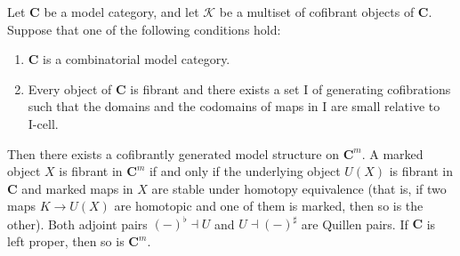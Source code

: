 \documentclass[reqno]{amsart}
\theoremstyle{definition}
\theoremstyle{remark}
\newcommand{\cat}[1]{\mathbf{#1}}
\newcommand{\C}{\cat{C}}
\newcommand{\I}{\mathrm{I}}
\newcommand{\class}[2]{#1\text{-}\mathrm{#2}}
\newcommand{\Icell}[1][\I]{\class{#1}{cell}}
\numberwithin{figure}{section}
\begin{document}
\begin{thm}
Let $\C$ be a model category, and let $\mathcal{K}$ be a multiset of cofibrant objects of $\C$.
Suppose that one of the following conditions hold:
\begin{enumerate}
\item \label{it:comb} $\C$ is a combinatorial model category.
\item \label{it:fib} Every object of $\C$ is fibrant and there exists a set $\I$ of generating cofibrations such that
the domains and the codomains of maps in $\I$ are small relative to $\Icell$.
\end{enumerate}
Then there exists a cofibrantly generated model structure on $\C^m$.
A marked object $X$ is fibrant in $\C^m$ if and only if the underlying object $U(X)$ is fibrant in $\C$ and marked maps in $X$ are stable under homotopy equivalence
(that is, if two maps $K \to U(X)$ are homotopic and one of them is marked, then so is the other).
Both adjoint pairs $(-)^\flat \dashv U$ and $U \dashv (-)^\sharp$ are Quillen pairs.
If $\C$ is left proper, then so is $\C^m$.
\end{thm}
\end{document}

